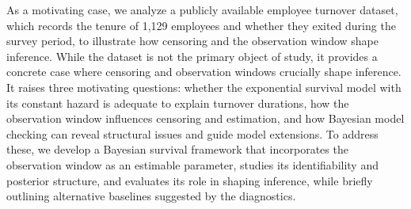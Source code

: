 As a motivating case, we analyze a publicly available employee turnover dataset, which records the tenure of 1,129 employees and whether they exited during the survey period, to illustrate how censoring and the observation window shape inference. While the dataset is not the primary object of study, it provides a concrete case where censoring and observation windows crucially shape inference. It raises three motivating questions: whether the exponential survival model with its constant hazard is adequate to explain turnover durations, how the observation window influences censoring and estimation, and how Bayesian model checking can reveal structural issues and guide model extensions. To address these, we develop a Bayesian survival framework that incorporates the observation window as an estimable parameter, studies its identifiability and posterior structure, and evaluates its role in shaping inference, while briefly outlining alternative baselines suggested by the diagnostics.
